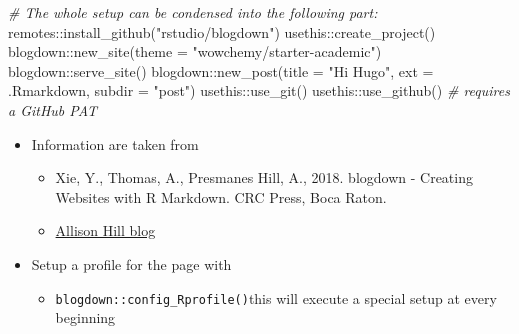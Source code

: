 \documentclass[
]{article}
\newenvironment{Shaded}{\begin{snugshade}}{\end{snugshade}}
\newcommand{\AttributeTok}[1]{\textcolor[rgb]{0.77,0.63,0.00}{#1}}
\newcommand{\CommentTok}[1]{\textcolor[rgb]{0.56,0.35,0.01}{\textit{#1}}}
\newcommand{\FunctionTok}[1]{\textcolor[rgb]{0.00,0.00,0.00}{#1}}
\newcommand{\NormalTok}[1]{#1}
\newcommand{\SpecialCharTok}[1]{\textcolor[rgb]{0.00,0.00,0.00}{#1}}
\newcommand{\StringTok}[1]{\textcolor[rgb]{0.31,0.60,0.02}{#1}}
\providecommand{\tightlist}{%
  \setlength{\itemsep}{0pt}\setlength{\parskip}{0pt}}
\begin{document}
\begin{Shaded}
\begin{Highlighting}[]
\CommentTok{\# The whole setup can be condensed into the following part:}
\NormalTok{remotes}\SpecialCharTok{::}\FunctionTok{install\_github}\NormalTok{(}\StringTok{"rstudio/blogdown"}\NormalTok{)}
\NormalTok{usethis}\SpecialCharTok{::}\FunctionTok{create\_project}\NormalTok{()}
\NormalTok{blogdown}\SpecialCharTok{::}\FunctionTok{new\_site}\NormalTok{(}\AttributeTok{theme =} \StringTok{"wowchemy/starter{-}academic"}\NormalTok{)}
\NormalTok{blogdown}\SpecialCharTok{::}\FunctionTok{serve\_site}\NormalTok{()}
\NormalTok{blogdown}\SpecialCharTok{::}\FunctionTok{new\_post}\NormalTok{(}\AttributeTok{title =} \StringTok{"Hi Hugo"}\NormalTok{, }
                     \AttributeTok{ext =} \StringTok{\textquotesingle{}.Rmarkdown\textquotesingle{}}\NormalTok{, }
                     \AttributeTok{subdir =} \StringTok{"post"}\NormalTok{)}
\NormalTok{usethis}\SpecialCharTok{::}\FunctionTok{use\_git}\NormalTok{()}
\NormalTok{usethis}\SpecialCharTok{::}\FunctionTok{use\_github}\NormalTok{() }\CommentTok{\# requires a GitHub PAT}
\end{Highlighting}
\end{Shaded}

\begin{itemize}
\tightlist
\item
  Information are taken from

  \begin{itemize}
  \tightlist
  \item
    Xie, Y., Thomas, A., Presmanes Hill, A., 2018. blogdown -
    Creating Websites with R Markdown. CRC Press, Boca Raton.
  \item
    \href{https://alison.rbind.io/post/new-year-new-blogdown/}{Allison Hill
    blog}
  \end{itemize}
\item
  Setup a profile for the page with

  \begin{itemize}
  \tightlist
  \item
    \texttt{blogdown::config\_Rprofile()}this will execute a special setup
    at every beginning
  \end{itemize}
\end{itemize}
\end{document}
